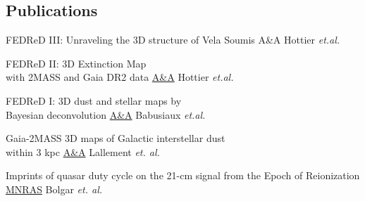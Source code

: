 \documentclass[
 a4paper, 9.5pt,
  sidebarwidth=0.28\paperwidth,
]{fortysecondscv}
\begin{document}
\makefrontsidebar

\begin{cvtable}
\end{cvtable}


\begin{cvtable}
\end{cvtable}

\subsection{Publications}
\begin{cvtable}
  {FEDReD III: Unraveling the 3D structure of Vela}
  {Soumis A\&A}
  {Hottier \textit{et.al.}}

  {FEDReD II: 3D Extinction Map\\ with 2MASS and Gaia DR2 data}
  {\href{https://ui.adsabs.harvard.edu/abs/2020arXiv200703734H/abstract}{A\&A}}
  {Hottier \textit{et.al.}}

  {FEDReD I: 3D dust and stellar maps by \\Bayesian deconvolution}
  {\href{https://ui.adsabs.harvard.edu/abs/2020arXiv200704455B/abstract}{A\&A}}
  {Babusiaux \textit{et.al.}}

  {Gaia-2MASS 3D maps of Galactic interstellar dust\\within 3 kpc}
  {\href{https://ui.adsabs.harvard.edu/\#abs/2019arXiv190204116L/abstract}{A\&A}}
  {Lallement \textit{et. al.}}

  {Imprints of quasar duty cycle on the 21-cm signal from the Epoch of Reionization}
  {\href{https://ui.adsabs.harvard.edu/\#abs/2019arXiv190204116L/abstract}{MNRAS}}
  {Bolgar \textit{et. al.}}
\end{cvtable}
\end{document}
